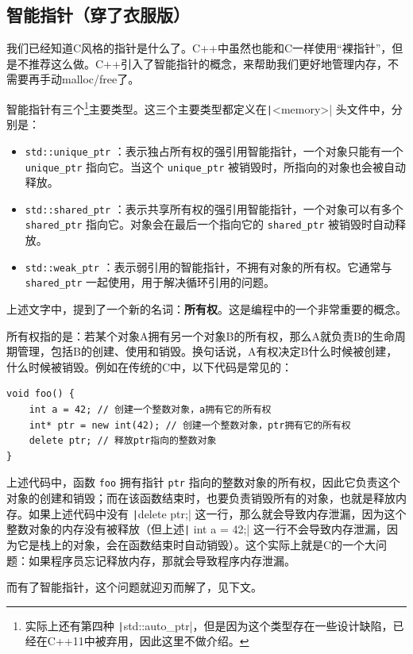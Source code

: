 \subsection{智能指针（穿了衣服版）}

我们已经知道C风格的指针是什么了。C++中虽然也能和C一样使用“裸指针”，但是不推荐这么做。C++引入了智能指针的概念，来帮助我们更好地管理内存，不需要再手动malloc/free了。

智能指针有三个\footnote{实际上还有第四种 \texttt|std::auto\_ptr|，但是因为这个类型存在一些设计缺陷，已经在C++11中被弃用，因此这里不做介绍。}主要类型。这三个主要类型都定义在\texttt|<memory>| 头文件中，分别是：
\begin{itemize}
  \item \texttt{std::unique\_ptr} ：表示独占所有权的强引用智能指针，一个对象只能有一个 \texttt{unique\_ptr} 指向它。当这个 \texttt{unique\_ptr} 被销毁时，所指向的对象也会被自动释放。
  \item \texttt{std::shared\_ptr} ：表示共享所有权的强引用智能指针，一个对象可以有多个 \texttt{shared\_ptr} 指向它。对象会在最后一个指向它的 \texttt{shared\_ptr} 被销毁时自动释放。
  \item \texttt{std::weak\_ptr} ：表示弱引用的智能指针，不拥有对象的所有权。它通常与 \texttt{shared\_ptr} 一起使用，用于解决循环引用的问题。
\end{itemize}

\begin{note}
    上述文字中，提到了一个新的名词：\textbf{所有权}。这是编程中的一个非常重要的概念。

    所有权指的是：若某个对象A拥有另一个对象B的所有权，那么A就负责B的生命周期管理，包括B的创建、使用和销毁。换句话说，A有权决定B什么时候被创建，什么时候被销毁。例如在传统的C中，以下代码是常见的：
    \begin{verbatim}
void foo() {    
    int a = 42; // 创建一个整数对象，a拥有它的所有权
    int* ptr = new int(42); // 创建一个整数对象，ptr拥有它的所有权
    delete ptr; // 释放ptr指向的整数对象
}
    \end{verbatim}
    上述代码中，函数 \texttt{foo} 拥有指针 \texttt{ptr} 指向的整数对象的所有权，因此它负责这个对象的创建和销毁；而在该函数结束时，也要负责销毁所有的对象，也就是释放内存。如果上述代码中没有 \texttt|delete ptr;| 这一行，那么就会导致内存泄漏，因为这个整数对象的内存没有被释放（但上述\texttt| int a = 42;| 这一行不会导致内存泄漏，因为它是栈上的对象，会在函数结束时自动销毁）。这个实际上就是C的一个大问题：如果程序员忘记释放内存，那就会导致程序内存泄漏。

    而有了智能指针，这个问题就迎刃而解了，见下文。
\end{note}

